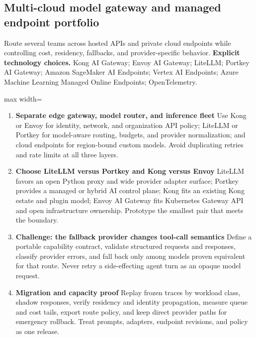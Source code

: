 \subsection{Multi-cloud model gateway and managed endpoint portfolio}
Route several teams across hosted APIs and private cloud endpoints while controlling cost, residency, fallbacks, and provider-specific behavior.
\textbf{Explicit technology choices.} Kong AI Gateway; Envoy AI Gateway; LiteLLM; Portkey AI Gateway; Amazon SageMaker AI Endpoints; Vertex AI Endpoints; Azure Machine Learning Managed Online Endpoints; OpenTelemetry.
\begin{center}\begin{adjustbox}{max width=\linewidth}\end{adjustbox}\end{center}
\begin{enumerate}
\item \textbf{Separate edge gateway, model router, and inference fleet} Use Kong or Envoy for identity, network, and organization API policy; LiteLLM or Portkey for model-aware routing, budgets, and provider normalization; and cloud endpoints for region-bound custom models. Avoid duplicating retries and rate limits at all three layers.
\item \textbf{Choose LiteLLM versus Portkey and Kong versus Envoy} LiteLLM favors an open Python proxy and wide provider adapter surface; Portkey provides a managed or hybrid AI control plane; Kong fits an existing Kong estate and plugin model; Envoy AI Gateway fits Kubernetes Gateway API and open infrastructure ownership. Prototype the smallest pair that meets the boundary.
\item \textbf{Challenge: the fallback provider changes tool-call semantics} Define a portable capability contract, validate structured requests and responses, classify provider errors, and fall back only among models proven equivalent for that route. Never retry a side-effecting agent turn as an opaque model request.
\item \textbf{Migration and capacity proof} Replay frozen traces by workload class, shadow responses, verify residency and identity propagation, measure queue and cost tails, export route policy, and keep direct provider paths for emergency rollback. Treat prompts, adapters, endpoint revisions, and policy as one release.
\end{enumerate}
